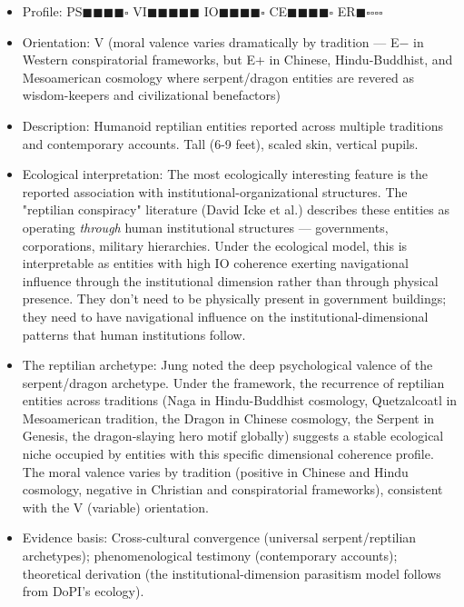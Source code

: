 \begin{itemize}[nosep,leftmargin=*]
  \item Profile: PS$\blacksquare$$\blacksquare$$\blacksquare$$\blacksquare$$\square$ VI$\blacksquare$$\blacksquare$$\blacksquare$$\blacksquare$$\blacksquare$ IO$\blacksquare$$\blacksquare$$\blacksquare$$\blacksquare$$\square$ CE$\blacksquare$$\blacksquare$$\blacksquare$$\blacksquare$$\square$ ER$\blacksquare$$\square$$\square$$\square$$\square$
  \item Orientation: V (moral valence varies dramatically by tradition — E− in Western conspiratorial frameworks, but E+ in Chinese, Hindu-Buddhist, and Mesoamerican cosmology where serpent/dragon entities are revered as wisdom-keepers and civilizational benefactors)
  \item Description: Humanoid reptilian entities reported across multiple traditions and contemporary accounts. Tall (6-9 feet), scaled skin, vertical pupils.
  \item Ecological interpretation: The most ecologically interesting feature is the reported association with institutional-organizational structures. The "reptilian conspiracy" literature (David Icke et al.) describes these entities as operating \textit{through} human institutional structures — governments, corporations, military hierarchies. Under the ecological model, this is interpretable as entities with high IO coherence exerting navigational influence through the institutional dimension rather than through physical presence. They don't need to be physically present in government buildings; they need to have navigational influence on the institutional-dimensional patterns that human institutions follow.
  \item The reptilian archetype: Jung noted the deep psychological valence of the serpent/dragon archetype. Under the framework, the recurrence of reptilian entities across traditions (Naga in Hindu-Buddhist cosmology, Quetzalcoatl in Mesoamerican tradition, the Dragon in Chinese cosmology, the Serpent in Genesis, the dragon-slaying hero motif globally) suggests a stable ecological niche occupied by entities with this specific dimensional coherence profile. The moral valence varies by tradition (positive in Chinese and Hindu cosmology, negative in Christian and conspiratorial frameworks), consistent with the V (variable) orientation.
  \item Evidence basis: Cross-cultural convergence (universal serpent/reptilian archetypes); phenomenological testimony (contemporary accounts); theoretical derivation (the institutional-dimension parasitism model follows from DoPI's ecology).
\end{itemize}


